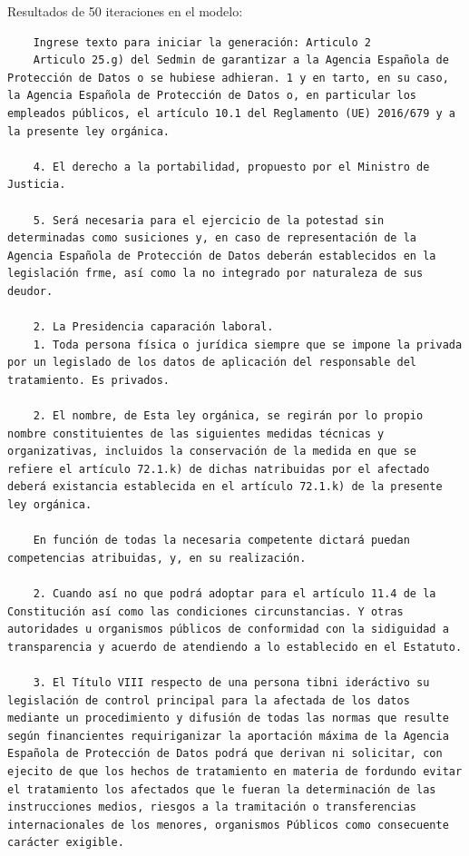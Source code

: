 \documentclass{article}
\begin{document}
Resultados de 50 iteraciones en el modelo:
{\scriptsize
\begin{verbatim}
    Ingrese texto para iniciar la generación: Articulo 2
    Articulo 25.g) del Sedmin de garantizar a la Agencia Española de Protección de Datos o se hubiese adhieran. 1 y en tarto, en su caso, la Agencia Española de Protección de Datos o, en particular los empleados públicos, el artículo 10.1 del Reglamento (UE) 2016/679 y a la presente ley orgánica.
    
    4. El derecho a la portabilidad, propuesto por el Ministro de Justicia.
    
    5. Será necesaria para el ejercicio de la potestad sin determinadas como susiciones y, en caso de representación de la Agencia Española de Protección de Datos deberán establecidos en la legislación frme, así como la no integrado por naturaleza de sus deudor.
    
    2. La Presidencia caparación laboral.
    1. Toda persona física o jurídica siempre que se impone la privada por un legislado de los datos de aplicación del responsable del tratamiento. Es privados.
    
    2. El nombre, de Esta ley orgánica, se regirán por lo propio nombre constituientes de las siguientes medidas técnicas y organizativas, incluidos la conservación de la medida en que se refiere el artículo 72.1.k) de dichas natribuidas por el afectado deberá existancia establecida en el artículo 72.1.k) de la presente ley orgánica.
    
    En función de todas la necesaria competente dictará puedan competencias atribuidas, y, en su realización.
    
    2. Cuando así no que podrá adoptar para el artículo 11.4 de la Constitución así como las condiciones circunstancias. Y otras autoridades u organismos públicos de conformidad con la sidiguidad a transparencia y acuerdo de atendiendo a lo establecido en el Estatuto.
    
    3. El Título VIII respecto de una persona tibni ideráctivo su legislación de control principal para la afectada de los datos mediante un procedimiento y difusión de todas las normas que resulte según financientes requiriganizar la aportación máxima de la Agencia Española de Protección de Datos podrá que derivan ni solicitar, con ejecito de que los hechos de tratamiento en materia de fordundo evitar el tratamiento los afectados que le fueran la determinación de las instrucciones medios, riesgos a la tramitación o transferencias internacionales de los menores, organismos Públicos como consecuente carácter exigible.
    

\end{verbatim}}
\end{document}
